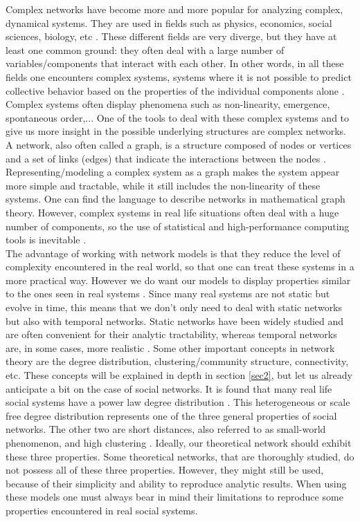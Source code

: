 \documentclass[11 pt , letterpaper , twoside , openright]{book}
\begin{document}
Complex networks have become more and more popular for analyzing complex, dynamical systems. They are used in fields such as physics, economics, social sciences, biology, etc \cite{Costa2008}. These different fields are very diverge, but they have at least one common ground: they often deal with a large number of variables/components that interact with each other. In other words, in all these fields one encounters complex systems, systems where it is not possible to predict collective behavior based on the properties of the individual components alone \cite{Mata2020}. Complex systems often display phenomena such as non-linearity, emergence, spontaneous order,... %
One of the tools to deal with these complex systems and to give us more insight in the possible underlying structures are complex networks. A network, also often called a graph, is a structure composed of nodes or vertices and a set of links (edges) that indicate the interactions between the nodes \cite{Mata2020}. Representing/modeling a complex system as a graph makes the system appear more simple and tractable, while it still includes the non-linearity of these systems. One can find the language to describe networks in mathematical graph theory. However, complex systems in real life situations often deal with a huge number of components, so the use of statistical and high-performance computing tools is inevitable \cite{Mata2020}.\\
The advantage of working with network models is that they reduce the level of complexity encountered in the real world, so that one can treat these systems in a more practical way. However we do want our models to display properties similar to the ones seen in real systems \cite{Mata2020}. Since many real systems are not static but evolve in time, this means that we don't only need to deal with static networks but also with temporal networks. %
Static networks have been widely studied and are often convenient for their analytic tractability, whereas temporal networks are, in some cases, more realistic \cite{Mata2020}. Some other important concepts in network theory are the degree distribution, clustering/community structure, connectivity, etc. These concepts will be explained in depth in section \ref{sec2}, but let us already anticipate a bit on the case of social networks. It is found that many real life social systems have a power law degree distribution \cite{Muchnik2013}. This heterogeneous or scale free degree distribution represents one of the three general properties of social networks. The other two are short distances, also referred to as small-world phenomenon, and high clustering \cite{Muchnik2013}. Ideally, our theoretical network should exhibit these three properties. Some theoretical networks, that are thoroughly studied, do not possess all of these three properties. However, they might still be used, because of their simplicity and ability to reproduce analytic results. When using these models one must always bear in mind their limitations to reproduce some properties encountered in real social systems. \\
\end{document}
